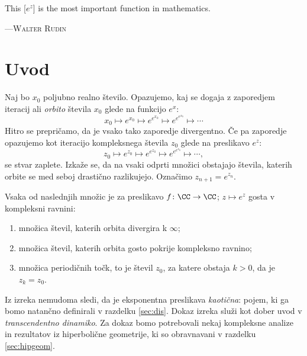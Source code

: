 \let\origthefootnote\thefootnote
\renewcommand{\thefootnote}{\fnsymbol{footnote}}

\epigraph{
    This \textup{[\(e^z\)]} is the most important function in mathematics.
    }{
        \textsc{---Walter Rudin}\footnotemark
    }
        

\let\thefootnote\origthefootnote

\section{Uvod} \label{sec:intro}

Naj bo \(x_0\) poljubno realno število. Opazujemo, kaj se dogaja z zaporedjem iteracij ali \emph{orbito} števila \(x_0\) glede na funkcijo \(e^{x}\):
\[x_0 \mapsto e^{x_0} \mapsto e^{e^{x_0}} \mapsto e^{e^{e^{x_0}}} \mapsto \cdots\]
Hitro se prepričamo, da je vsako tako zaporedje divergentno. Če pa zaporedje opazujemo kot iteracijo kompleksnega števila \(z_0\) glede na preslikavo \(e^z\):
\[z_0 \mapsto e^{z_0} \mapsto e^{e^{z_0}} \mapsto e^{e^{e^{z_0}}} \mapsto \cdots,\]
se stvar zaplete. Izkaže se, da na vsaki odprti množici obstajajo števila, katerih orbite se med seboj drastično razlikujejo. Označimo \(z_{n + 1} = e^{z_n}\).

\begin{izrek} \label{thm:orbits}
    Vsaka od naslednjih množic je za preslikavo \(f \colon \CC \to \CC\); \(z \mapsto e^{z}\) gosta v kompleksni ravnini:
    \begin{enumerate}
        \item množica števil, katerih orbita divergira k \(\infty\);
        \item množica števil, katerih orbita gosto pokrije kompleksno ravnino;
        \item množica periodičnih točk, to je števil \(z_0\), za katere obstaja \(k > 0\), da je \(z_k = z_0\).
    \end{enumerate}
\end{izrek}

\noindent Iz izreka nemudoma sledi, da je eksponentna preslikava \emph{kaotična}: pojem, ki ga bomo natančno definirali v razdelku \ref{sec:dis}. Dokaz izreka služi kot dober uvod v \emph{transcendentno dinamiko}. Za dokaz bomo potrebovali nekaj kompleksne analize in rezultatov iz hiperbolične geometrije, ki so obravnavani v razdelku \ref{sec:hipgeom}.

